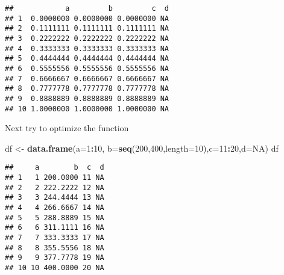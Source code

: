 \documentclass[]{article}
\newenvironment{Shaded}{\begin{snugshade}}{\end{snugshade}}
\newcommand{\KeywordTok}[1]{\textcolor[rgb]{0.13,0.29,0.53}{\textbf{#1}}}
\newcommand{\DataTypeTok}[1]{\textcolor[rgb]{0.13,0.29,0.53}{#1}}
\newcommand{\DecValTok}[1]{\textcolor[rgb]{0.00,0.00,0.81}{#1}}
\newcommand{\StringTok}[1]{\textcolor[rgb]{0.31,0.60,0.02}{#1}}
\newcommand{\OtherTok}[1]{\textcolor[rgb]{0.56,0.35,0.01}{#1}}
\newcommand{\ControlFlowTok}[1]{\textcolor[rgb]{0.13,0.29,0.53}{\textbf{#1}}}
\newcommand{\OperatorTok}[1]{\textcolor[rgb]{0.81,0.36,0.00}{\textbf{#1}}}
\newcommand{\NormalTok}[1]{#1}
\begin{document}
\begin{Shaded}
\end{Shaded}

\begin{verbatim}
##            a         b         c  d
## 1  0.0000000 0.0000000 0.0000000 NA
## 2  0.1111111 0.1111111 0.1111111 NA
## 3  0.2222222 0.2222222 0.2222222 NA
## 4  0.3333333 0.3333333 0.3333333 NA
## 5  0.4444444 0.4444444 0.4444444 NA
## 6  0.5555556 0.5555556 0.5555556 NA
## 7  0.6666667 0.6666667 0.6666667 NA
## 8  0.7777778 0.7777778 0.7777778 NA
## 9  0.8888889 0.8888889 0.8888889 NA
## 10 1.0000000 1.0000000 1.0000000 NA
\end{verbatim}

Next try to optimize the function

\begin{Shaded}
\begin{Highlighting}[]
\NormalTok{df <-}\StringTok{ }\KeywordTok{data.frame}\NormalTok{(}\DataTypeTok{a=}\DecValTok{1}\OperatorTok{:}\DecValTok{10}\NormalTok{, }\DataTypeTok{b=}\KeywordTok{seq}\NormalTok{(}\DecValTok{200}\NormalTok{,}\DecValTok{400}\NormalTok{,}\DataTypeTok{length=}\DecValTok{10}\NormalTok{),}\DataTypeTok{c=}\DecValTok{11}\OperatorTok{:}\DecValTok{20}\NormalTok{,}\DataTypeTok{d=}\OtherTok{NA}\NormalTok{) }
\NormalTok{df}
\end{Highlighting}
\end{Shaded}

\begin{verbatim}
##     a        b  c  d
## 1   1 200.0000 11 NA
## 2   2 222.2222 12 NA
## 3   3 244.4444 13 NA
## 4   4 266.6667 14 NA
## 5   5 288.8889 15 NA
## 6   6 311.1111 16 NA
## 7   7 333.3333 17 NA
## 8   8 355.5556 18 NA
## 9   9 377.7778 19 NA
## 10 10 400.0000 20 NA
\end{verbatim}
\end{document}
